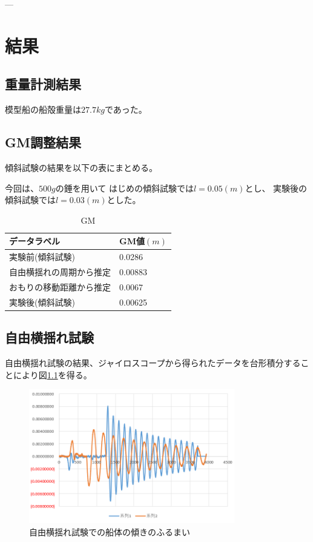 \documentclass[dvipdfmx,a4paper]{jreport} %
\begin{document}
---

\chapter{結果}
\section{重量計測結果}
模型船の船殻重量は$27.7kg$であった。

\section{GM調整結果}
傾斜試験の結果を以下の表にまとめる。


今回は、$500g$の錘を用いて
はじめの傾斜試験では$l=0.05(m)$とし、
実験後の傾斜試験では$l=0.03(m)$とした。
\begin{table}[htbp]
    \caption{GM}
    \label{table:gm}
    \centering
    \begin{tabular}{|l|l|}
        \hline
        \textbf{データラベル} & \textbf{GM値$(m)$} \\
        \hline
        実験前(傾斜試験)&0.0286\\
        自由横揺れの周期から推定&0.00883\\
        おもりの移動距離から推定&0.0067\\
        実験後(傾斜試験)&0.00625\\
        \hline
    \end{tabular}
\end{table}


\section{自由横揺れ試験}
自由横揺れ試験の結果、ジャイロスコープから得られたデータを台形積分することにより図\ref{fig:yokoyure}を得る。
 \begin{figure}[H] %
     \centering
     \includegraphics[width=0.8\textwidth]{summer/ship-experiment/long-pool/yokoyure.png} %
     \caption{自由横揺れ試験での船体の傾きのふるまい}
     \label{fig:yokoyure}
 \end{figure}
\end{document}
